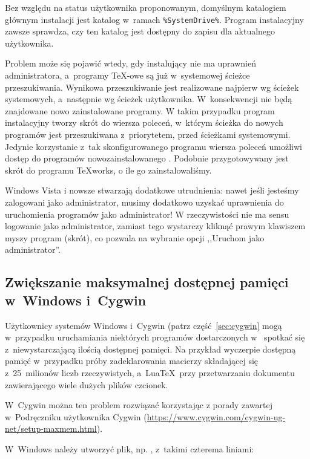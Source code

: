 \documentclass{article}
\begin{document}
Bez względu na status użytkownika proponowanym, domyślnym katalogiem głównym
instalacji jest katalog w~ramach \verb|%SystemDrive%|. Program instalacyjny
zawsze sprawdza, czy ten katalog jest dostępny do zapisu dla aktualnego
użytkownika.

Problem może się  pojawić wtedy, gdy instalujący \TL{} nie ma uprawnień
administratora, a~programy \TeX-owe są już w~systemowej ścieżce przeszukiwania.
Wynikowa przeszukiwanie jest realizowane najpierw wg ścieżek systemowych,
a~następnie wg ścieżek użytkownika. W~konsekwencji nie będą znajdowane nowo
zainstalowane programy. W takim przypadku program instalacyjny tworzy skrót
do wiersza poleceń, w~którym ścieżka do nowych programów \TL{} jest przeszukiwana
z~priorytetem, przed ścieżkami systemowymi. Jedynie korzystanie z~tak skonfigurowanego
programu wiersza poleceń umożliwi dostęp do  programów nowozainstalowanego \TL.
Podobnie przygotowywany jest skrót do programu \TeX{}works, o ile go zainstalowaliśmy.

Windows Vista i nowsze stwarzają dodatkowe utrudnienia: nawet jeśli
jesteśmy zalogowani jako administrator, musimy dodatkowo uzyskać uprawnienia do
uruchomienia programów jako administrator! W rzeczywistości nie ma sensu
logowanie jako administrator, zamiast tego wystarczy kliknąć prawym klawiszem
myszy program (skrót), co pozwala na wybranie opcji ,,Uruchom jako
administrator''.


\subsection{Zwiększanie maksymalnej  dostępnej pamięci
w~Windows i~Cygwin}
\label{sec:cygwin-maxmem}

Użytkownicy systemów Windows i~Cygwin (patrz część~\ref{sec:cygwin} mogą w~przypadku uruchamiania niektórych programów dostarczonych w~\TL{} spotkać się  z~niewystarczającą
ilością dostępnej pamięci.  Na przykład  wyczerpie dostępną pamięć
w~przypadku próby zadeklarowania macierzy składającej się  z~25~milionów liczb
rzeczywistych, a~Lua\TeX\ przy przetwarzaniu dokumentu zawierającego wiele
dużych plików czcionek.

W~Cygwin można ten problem rozwiązać korzystając z porady zawartej
w~Podręczniku użytkownika Cygwin
(\url{https://www.cygwin.com/cygwin-ug-net/setup-maxmem.html}).

W~Windows należy utworzyć plik, np. , z~takimi czterema liniami:
\end{document}
